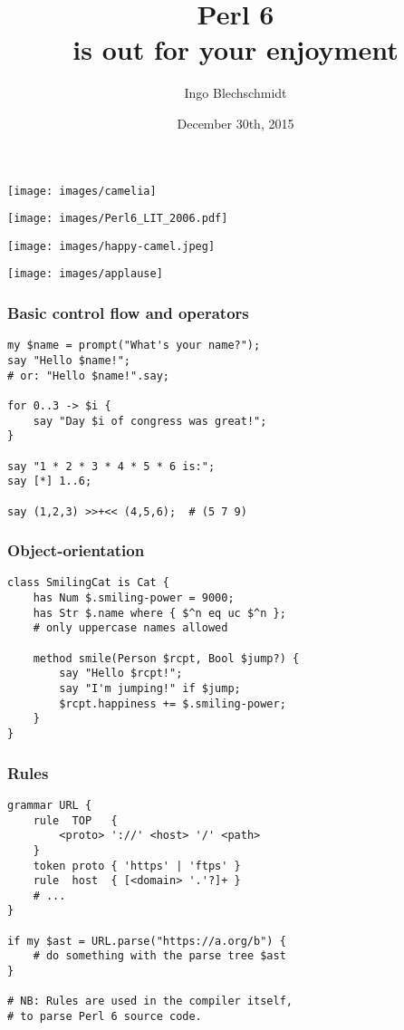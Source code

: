 \documentclass[14pt,compress,english,utf8,t]{beamer}
\title[
  \raisebox{-0.3mm}{\DejaSans ☺} Perl 6 is out for your enjoyment
  \raisebox{-0.3mm}{\DejaSans ☺}
]{\raisebox{-0.3mm}{\DejaSans ☺} Perl 6 \raisebox{-0.3mm}{\DejaSans ☺} \\
  is out for your enjoyment
}
\author[Ingo Blechschmidt]{\small Ingo Blechschmidt}
\institute{32th Chaos Communication Congress}
\date[December 30th, 2015]{\small December 30th, 2015}
\begin{document}
\begin{frame}
  \titlepage

  \vspace*{-1em}
  \begin{center}
    \texttt{[image: images/camelia]}
  \end{center}
\end{frame}

\begin{frame}[plain,c]
  \hspace*{-0.4cm}\texttt{[image: images/Perl6\_LIT\_2006.pdf]}
\end{frame}

\begin{frame}[plain,c]
  \centering
  \texttt{[image: images/happy-camel.jpeg]}
  \par
\end{frame}

\begin{frame}[plain,c]
  \centering
  \texttt{[image: images/applause]}
  \par
\end{frame}

\begin{frame}[fragile]\frametitle{Basic control flow and operators}
  \begin{verbatim}
my $name = prompt("What's your name?");
say "Hello $name!";
# or: "Hello $name!".say;

for 0..3 -> $i {
    say "Day $i of congress was great!";
}

say "1 * 2 * 3 * 4 * 5 * 6 is:";
say [*] 1..6;

say (1,2,3) >>+<< (4,5,6);  # (5 7 9)
  \end{verbatim}
\end{frame}

\begin{frame}[fragile]\frametitle{Object-orientation}
  \begin{verbatim}
class SmilingCat is Cat {
    has Num $.smiling-power = 9000;
    has Str $.name where { $^n eq uc $^n };
    # only uppercase names allowed

    method smile(Person $rcpt, Bool $jump?) {
        say "Hello $rcpt!";
        say "I'm jumping!" if $jump;
        $rcpt.happiness += $.smiling-power;
    }
}
  \end{verbatim}
\end{frame}

\begin{frame}[fragile]\frametitle{Rules}
  \small
  \begin{verbatim}
grammar URL {
    rule  TOP   {
        <proto> '://' <host> '/' <path>
    }
    token proto { 'https' | 'ftps' }
    rule  host  { [<domain> '.'?]+ }
    # ...
}

if my $ast = URL.parse("https://a.org/b") {
    # do something with the parse tree $ast
}

# NB: Rules are used in the compiler itself,
# to parse Perl 6 source code.
  \end{verbatim}
\end{frame}
\end{document}
